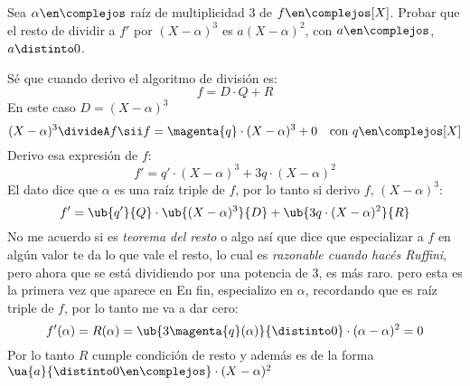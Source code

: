 \begin{enunciado}{\ejercicio}
  Sea $\alpha \en \complejos$ raíz de multiplicidad 3 de $f \en \complejos[X]$. Probar que el resto de dividir a $f'$ por
  $(X - \alpha)^3$ es $a(X - \alpha)^2$, con $a \en \complejos$, $a \distinto 0$.
\end{enunciado}

Sé que cuando derivo el algoritmo de división es:
$$
  f = D \cdot Q + R
$$
En este caso $D = (X - \alpha)^3$
$$
  (X - \alpha)^3 \divideA f
  \sii
  f = \magenta{q} \cdot  (X - \alpha)^3 + 0
  \quad \text{con }
  q \en \complejos[X]
$$
Derivo esa expresión de $f$:
$$
  f' = q' \cdot (X - \alpha)^3 + 3q \cdot (X-\alpha)^2
$$
El dato dice que $\alpha$ es una raíz triple de $f$, por lo tanto si derivo $f$, $(X - \alpha)^3$:
$$
  f' = \ub{q'}{Q} \cdot \ub{(X - \alpha)^3}{D}  + \ub{3q \cdot (X - \alpha)^2}{R}
$$
No me acuerdo si es \textit{teorema del resto} o algo así que dice que especializar a $f$ en algún valor te da lo que vale el resto,
lo cual es \textit{razonable cuando hacés Ruffini}, pero ahora que se está dividiendo por una potencia de 3, es más raro.
pero esta es la primera vez que aparece en
En fin, especializo en $\alpha$, recordando que es raíz triple de $f$, por lo tanto me va a dar cero:
$$
  f'(\alpha) = R(\alpha) =
  \ub{3\magenta{q}(\alpha)}{\distinto 0} \cdot (\alpha - \alpha)^2 = 0
$$
Por lo tanto $R$ cumple condición de resto y además es de la forma $\ua{a}{\distinto 0 \en \complejos} \cdot (X - \alpha)^2$

\begin{aportes}
  \item {}
\end{aportes}
